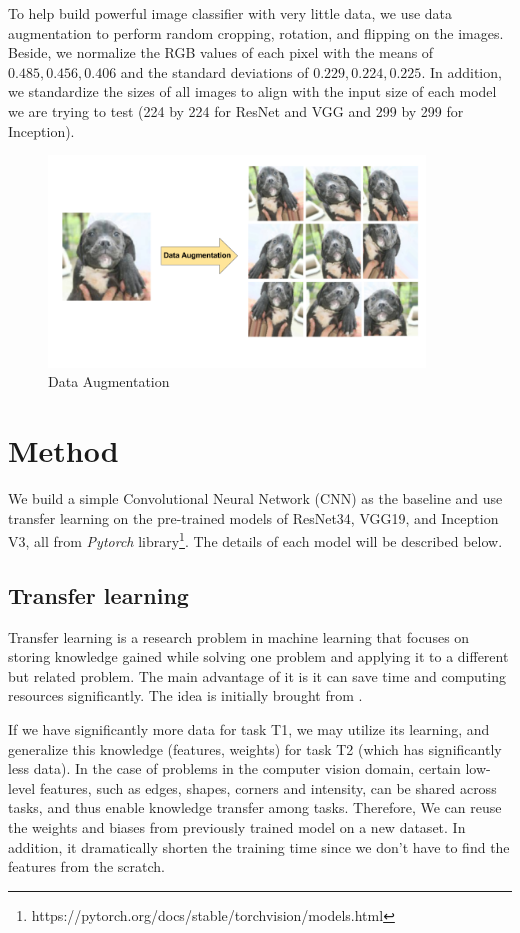 \documentclass{article}
\begin{document}
To help build powerful image classifier with very little data, we use data augmentation to perform random cropping, rotation, and flipping on the images. Beside, we normalize the RGB values of each pixel with the means of $0.485, 0.456, 0.406$ and the standard deviations of $0.229, 0.224, 0.225$. In addition, we standardize the sizes of all images to align with the input size of each model we are trying to test (224 by 224 for ResNet and VGG and 299 by 299 for Inception).
\begin{figure}[h!]
    \centering
    \includegraphics[width=10cm]{data_augmentation.png}
    \caption{Data Augmentation}
    \label{fig:aug}
\end{figure}

\section{Method}
We build a simple Convolutional Neural Network (CNN) as the baseline and use transfer learning on the pre-trained models of ResNet34, VGG19, and Inception V3, all from \textit{Pytorch}
library\footnote{https://pytorch.org/docs/stable/torchvision/models.html}. The details of each model will be described below. 

\subsection{Transfer learning}
Transfer learning is a research problem in machine learning that focuses on storing knowledge gained while solving one problem and applying it to a different but related problem. The main advantage of it is it can save time and computing resources significantly. The idea is initially brought from \cite{transfer_learning}.

If we have significantly more data for task T1, we may utilize its learning, and generalize this knowledge (features, weights) for task T2 (which has significantly less data). In the case of problems in the computer vision domain, certain low-level features, such as edges, shapes, corners and intensity, can be shared across tasks, and thus enable knowledge transfer among tasks. Therefore, We can reuse the weights and biases from previously trained model on a new dataset. In addition, it dramatically shorten the training time since we don’t have to find the features from the scratch.
\end{document}
